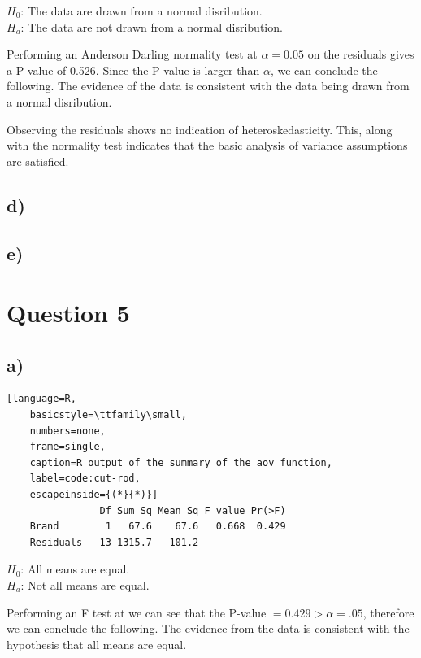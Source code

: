 \documentclass{article}
\begin{document}
\begin{flushleft}
$H_0$: The data are drawn from a normal disribution. \\
$H_a$: The data are not drawn from a normal disribution. \\
\end{flushleft}
Performing an Anderson Darling normality test at $\alpha = 0.05$ on the residuals gives a P-value of 0.526.
Since the P-value is larger than $\alpha$, we can conclude the following. 
The evidence of the data is consistent with the data being drawn from a normal disribution.

Observing the residuals shows no indication of heteroskedasticity. This, along with the normality test indicates that the
basic analysis of variance assumptions are satisfied.
\subsection*{d)}
\subsection*{e)}

\clearpage
\section*{Question 5}
\subsection*{a)}
\begin{lstlisting}[language=R, 
    basicstyle=\ttfamily\small,
    numbers=none, 
    frame=single, 
    caption=R output of the summary of the aov function,
    label=code:cut-rod,
    escapeinside={(*}{*)}]
                Df Sum Sq Mean Sq F value Pr(>F)
    Brand        1   67.6    67.6   0.668  0.429
    Residuals   13 1315.7   101.2 
\end{lstlisting}
\begin{flushleft}
$H_0$: All means are equal. \\
$H_a$: Not all means are equal. \\
\end{flushleft}
Performing an F test at we can see that the P-value $ = 0.429 > \alpha = .05$, therefore we can conclude the following.
The evidence from the data is consistent with the hypothesis that all means are equal.
\end{document}
